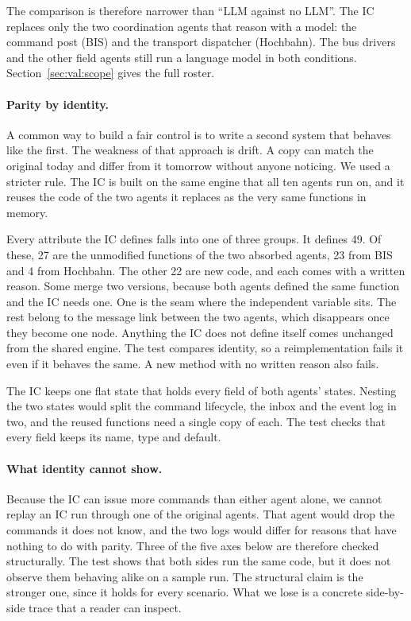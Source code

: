 The comparison is therefore narrower than ``LLM against no LLM''. The IC
replaces only the two coordination agents that reason with a model: the
command post (BIS) and the transport dispatcher (Hochbahn). The bus drivers and
the other field agents still run a language model in both conditions.
Section~\ref{sec:val:scope} gives the full roster.

\paragraph{Parity by identity.} A common way to build a fair control is to
write a second system that behaves like the first. The weakness of that
approach is drift. A copy can match the original today and differ from it
tomorrow without anyone noticing. We used a stricter rule. The IC is built on
the same engine that all ten agents run on, and it reuses the code of the two
agents it replaces as the very same functions in memory.

Every attribute the IC defines falls into one of three groups. It defines 49.
Of these, 27 are the unmodified functions of the two absorbed agents, 23 from
BIS and 4 from Hochbahn. The other 22 are new code, and each comes with a
written reason. Some merge two versions, because both agents defined the same
function and the IC needs one. One is the seam where the independent variable
sits. The rest belong to the message link between the two agents, which
disappears once they become one node. Anything the IC does not define itself
comes unchanged from the shared engine. The test compares identity, so a
reimplementation fails it even if it behaves the same. A new method with no
written reason also fails.

The IC keeps one flat state that holds every field of both agents' states.
Nesting the two states would split the command lifecycle, the inbox and the
event log in two, and the reused functions need a single copy of each. The
test checks that every field keeps its name, type and default.

\paragraph{What identity cannot show.} Because the IC can issue more commands
than either agent alone, we cannot replay an IC run through one of the original
agents. That agent would drop the commands it does not know, and the two logs
would differ for reasons that have nothing to do with parity. Three of the five
axes below are therefore checked structurally. The test shows that both sides
run the same code, but it does not observe them behaving alike on a sample
run. The structural claim is the stronger one, since it holds for every
scenario. What we lose is a concrete side-by-side trace that a reader can
inspect.

